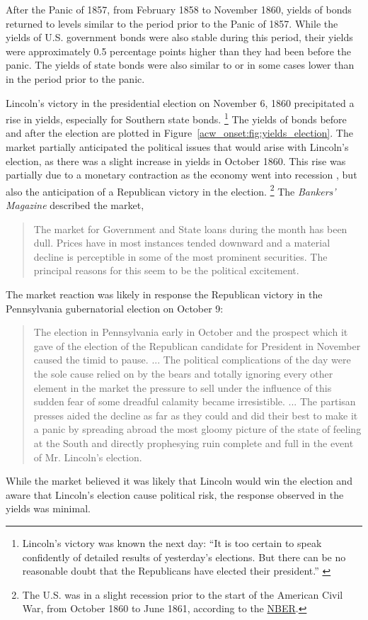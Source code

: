 After the Panic of 1857, from February 1858 to November 1860, yields of bonds returned to levels similar to the period prior to the Panic of 1857.
While the yields of U.S. government bonds were also stable during this period, their yields were approximately 0.5 percentage points higher than they had been before the panic.
The yields of state bonds were also similar to or in some cases lower than in the period prior to the panic.

Lincoln's victory in the presidential election on November 6, 1860 precipitated a rise in yields, especially for Southern state bonds.%
\footnote{Lincoln's victory was known the next day: ``It is too certain to speak confidently of detailed results of yesterday's elections. But there can be no reasonable doubt that the Republicans have elected their president.'' \parencite{NYT1860}}
The yields of bonds before and after the election are plotted in Figure~\ref{acw_onset:fig:yields_election}.
The market partially anticipated the political issues that would arise with Lincoln's election, as there was a slight increase in yields in October 1860.
This rise was partially due to a monetary contraction as the economy went into recession \parencite[413]{BankersMagazine1860}, but also the anticipation of a Republican victory in the election.%
\footnote{The U.S. was in a slight recession prior to the start of the American Civil War, from October 1860 to June 1861, according to the  \href{http://www.nber.org/cycles/cyclesmain.html}{NBER}.}
The \textit{Bankers' Magazine} described the market,
\begin{quote}
   The market for Government and State loans during the month has been dull.
   Prices have in most instances tended downward and a material decline is perceptible in some of the most prominent securities.
   The principal reasons for this seem to be the political excitement.  \parencite[414]{BankersMagazine1860}
\end{quote}
The market reaction was likely in response the Republican victory in the Pennsylvania gubernatorial election on October 9:
\begin{quote}
  The election in Pennsylvania early in October and the prospect which it gave of the election of the Republican candidate for President in November caused the timid to pause. ...
  The political complications of the day were the sole cause relied on by the bears and totally ignoring every other element in the market the pressure to sell under the influence of this sudden fear of some dreadful calamity became irresistible. ...
  The partisan presses aided the decline as far as they could and did their best to make it a panic by spreading abroad the most gloomy picture of the state of feeling at the South and directly prophesying ruin complete and full in the event of Mr. Lincoln's election.
  \parencites[476-77]{BankersMagazine1860}
\end{quote}
While the market believed it was likely that Lincoln would win the election and aware that Lincoln's election cause political risk, the  response observed in the yields was minimal.

